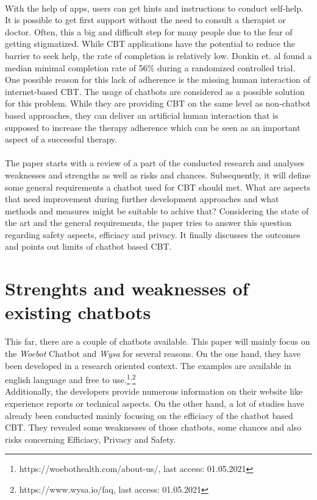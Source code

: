 \documentclass[sigconf, nonacm]{acmart}
\begin{document}
\\
With the help of apps, users can get hints and instructions to conduct self-help. It is possible
to get first support without the need to consult a therapist or doctor. Often, this a big and 
difficult step for many people due to the fear of getting stigmatized\cite{Rossler2016}.
While CBT applications have the potential to reduce the barrier to seek help, the rate of completion
is relatively low. Donkin et. al \cite{Donkin} found a median minimal completion rate of 56\% during a randomized controlled trial. 
One possible reason for this lack of adherence is the missing human interaction of internet-based CBT\cite{Ly2017}.
The usage of chatbots are considered as a possible solution for this problem. While they are providing CBT on the same level 
as non-chatbot based approaches, they can deliver an artificial human interaction that is supposed to increase the
therapy adherence which can be seen as an important aspect of a successful therapy. 
\\\\
The paper starts with a review of a part of the conducted research and analyses weaknesses and strengths as well as risks and chances. 
Subsequently, it will define some general requirements a chatbot used for CBT should met.
What are aspects that need improvement during further development approaches and what methods and measures might be suitable to achive that? 
Considering the state of the art and the general requirements, the paper tries to answer this question regarding safety aspects, efficiacy and privacy.
It finally discusses the outcomes and points out limits of chatbot based CBT.



\section{Strenghts and weaknesses of existing chatbots}
This far, there are a couple of chatbots available. This paper will mainly focus on the \emph{Woebot} Chatbot and \emph{Wysa} for several reasons.
On the one hand, they have been developed in a research oriented context. 
The examples are available in english language and free to use.\footnote{https://woebothealth.com/about-us/, last access: 01.05.2021}\textsuperscript{,}\footnote{https://www.wysa.io/faq, last access: 01.05.2021}
\\
Additionally, the developers provide numerous information on their website
like experience reports or technical aspects.
On the other hand, a lot of studies have already been conducted mainly focusing on the efficiacy of the chatbot based CBT. 
They revealed some weaknesses of those chatbots, some chances and also risks concerning Efficiacy, Privacy and Safety.
\end{document}
